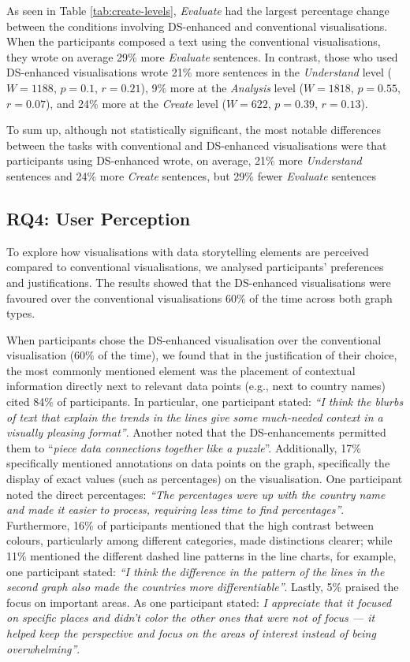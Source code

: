 As seen in Table \ref{tab:create-levels}, \textit{Evaluate} had the largest percentage change between the conditions involving DS-enhanced and conventional visualisations. When the participants composed a text using the conventional visualisations, they wrote on average 29\% more \textit{Evaluate} sentences. In contrast, those who used DS-enhanced visualisations wrote 21\% more sentences in the \textit{Understand} level ($W=1188$, $p=0.1$, $r=0.21$), 9\% more at the \textit{Analysis} level ($W=1818$, $p=0.55$, $r=0.07$), and 24\% more at the \textit{Create} level  ($W=622$, $p=0.39$, $r=0.13$). 

To sum up, although not statistically significant, the most notable differences between the tasks with conventional and DS-enhanced visualisations were that participants using DS-enhanced wrote, on average, 21\% more \textit{Understand} sentences and 24\% more \textit{Create} sentences, but 29\% fewer \textit{Evaluate} sentences 


\subsection{RQ4: User Perception}

To explore how visualisations with data storytelling elements are perceived compared to conventional visualisations, we analysed participants' preferences and justifications. The results showed that the DS-enhanced visualisations were favoured over the conventional visualisations 60\%  of the time across both graph types. 

When participants chose the DS-enhanced visualisation over the conventional visualisation (60\% of the time), we found that in the justification of their choice, the most commonly mentioned element was the placement of contextual information directly next to relevant data points (e.g., next to country names) cited 84\% of participants. In particular, one participant stated: \textit{``I think the blurbs of text that explain the trends in the lines give some much-needed context in a visually pleasing format''}. Another noted that the DS-enhancements permitted them to ``\textit{piece data connections together like a puzzle}''. Additionally, 17\% specifically mentioned annotations on data points on the graph, specifically the display of exact values (such as percentages) on the visualisation. One participant noted the direct percentages: \textit{``The percentages were up with the country name and made it easier to process, requiring less time to find percentages''}. Furthermore, 16\% of participants mentioned that the high contrast between colours, particularly among different categories, made distinctions clearer; while 11\% mentioned the different dashed line patterns in the line charts, for example, one participant stated: \textit{``I think the difference in the pattern of the lines in the second graph also made the countries more differentiable''}. Lastly, 5\% praised the focus on important areas. As one participant stated: \textit{I appreciate that it focused on specific places and didn't color the other ones that were not of focus — it helped keep the perspective and focus on the areas of interest instead of being overwhelming''}. 


